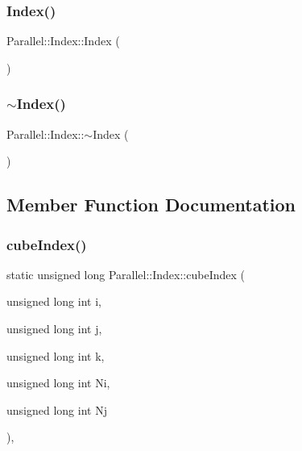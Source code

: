 \subsubsection{\texorpdfstring{Index()}{Index()}}
{\footnotesize\ttfamily Parallel\+::\+Index\+::\+Index (\begin{DoxyParamCaption}{ }\end{DoxyParamCaption})}

\mbox{\label{class_parallel_1_1_index_a8818acaa30db0ee6c8a1270a99731f86}} 
\subsubsection{\texorpdfstring{$\sim$Index()}{~Index()}}
{\footnotesize\ttfamily Parallel\+::\+Index\+::$\sim$\+Index (\begin{DoxyParamCaption}{ }\end{DoxyParamCaption})}



\subsection{Member Function Documentation}
\mbox{\label{class_parallel_1_1_index_ac406d7ceb12e986a66d64ef98fcef5d3}} 
\subsubsection{\texorpdfstring{cubeIndex()}{cubeIndex()}}
{\footnotesize\ttfamily static unsigned long Parallel\+::\+Index\+::cube\+Index (\begin{DoxyParamCaption}\item[{unsigned long int}]{i,  }\item[{unsigned long int}]{j,  }\item[{unsigned long int}]{k,  }\item[{unsigned long int}]{Ni,  }\item[{unsigned long int}]{Nj }\end{DoxyParamCaption})\hspace{0.3cm}{\ttfamily [inline]}, {\ttfamily [static]}}

